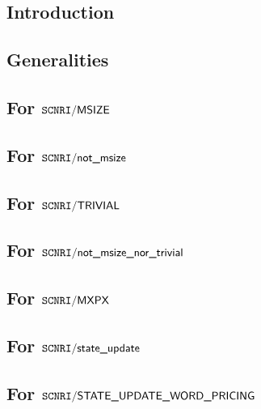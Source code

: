 \subsection{Introduction}                                          \label{mxp: computation: intro}                               
\subsection{Generalities}                                          \label{mxp: computation: generalities}                        
\subsection{For $\texttt{SCNRI}\textsf{/}{\textsf{MSIZE}}$}                               \label{mxp: computation: msize}                               
\subsection{For $\texttt{SCNRI}\textsf{/}{\textsf{not\_msize}}$}                         \label{mxp: computation: non msize}                           
\subsection{For $\texttt{SCNRI}\textsf{/}{\textsf{TRIVIAL}}$}                    \label{mxp: computation: trivial}                             
\subsection{For $\texttt{SCNRI}\textsf{/}{\textsf{not\_msize\_nor\_trivial}}$}               \label{mxp: computation: nontrivial}                          
\subsection{For $\texttt{SCNRI}\textsf{/}{\textsf{MXPX}}$}                                \label{mxp: computation: mxpx}                                
\subsection{For $\texttt{SCNRI}\textsf{/}{\textsf{state\_update}}$}                      \label{mxp: computation: state update}                        
\subsection{For $\texttt{SCNRI}\textsf{/}{\textsf{STATE\_UPDATE\_WORD\_PRICING}}$}              \label{mxp: computation: state update word pricing}           
